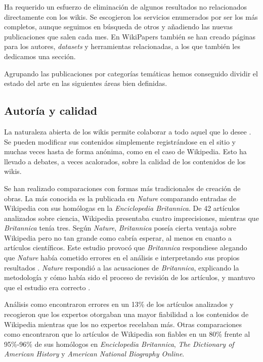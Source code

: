 \documentclass[11pt,onecolumn]{article}
\begin{document}
Ha requerido un esfuerzo de eliminación de algunos resultados no relacionados directamente con los wikis. Se escogieron los servicios enumerados por ser los más completos, aunque seguimos en búsqueda de otros y añadiendo las nuevas publicaciones que salen cada mes. En WikiPapers también se han creado páginas para los autores, \emph{datasets} y herramientas relacionadas, a los que también les dedicamos una sección.

Agrupando las publicaciones por categorías temáticas hemos conseguido dividir el estado del arte en las siguientes áreas bien definidas.

\subsection{Autoría y calidad}


La naturaleza abierta de los wikis permite colaborar a todo aquel que lo desee \citep{ward2001}. Se pueden modificar sus contenidos simplemente registrándose en el sitio y muchas veces hasta de forma anónima, como en el caso de Wikipedia. Esto ha llevado a debates, a veces acalorados, sobre la calidad de los contenidos de los wikis.

Se han realizado comparaciones con formas más tradicionales de creación de obras. La más conocida es la publicada en \emph{Nature} \citep{giles2005} comparando entradas de Wikipedia con sus homólogas en la \emph{Enciclopedia Britannica}. De 42 artículos analizados sobre ciencia, Wikipedia presentaba cuatro imprecisiones, mientras que \emph{Britannica} tenía tres. Según \emph{Nature}, \emph{Britannica} poseía cierta ventaja sobre Wikipedia pero no tan grande como cabría esperar, al menos en cuanto a artículos científicos. Este estudio provocó que \emph{Britannica} respondiese alegando que \emph{Nature} había cometido errores en el análisis e interpretando sus propios resultados \citep{britannica2006}. \emph{Nature} respondió a las acusaciones de \emph{Britannica}, explicando la metodología y cómo había sido el proceso de revisión de los artículos, y mantuvo que el estudio era correcto \citep{nature2006}.

Análisis como \citep{chesney2006} encontraron errores en un 13\% de los artículos analizados y recogieron que los expertos otorgaban una mayor fiabilidad a los contenidos de Wikipedia mientras que los no expertos recelaban más. Otras comparaciones como \citep{holman2008} encontraron que lo artículos de Wikipedia son fiables en un 80\% frente al 95\%-96\% de sus homólogos en \emph{Enciclopedia Britannica}, \emph{The Dictionary of American History} y \emph{American National Biography Online}.
\end{document}
